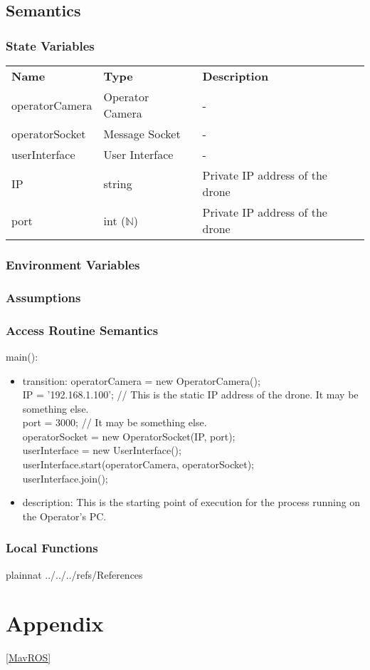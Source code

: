 \documentclass[12pt, titlepage]{article}
\begin{document}
\subsection{Semantics}
\subsubsection{State Variables}
\begin{center}
\begin{tabular}{p{3 cm} p{4cm} p{5cm} }
\hline
\textbf{Name} & \textbf{Type} & \textbf{Description}  \\
operatorCamera & Operator Camera & - \\
operatorSocket & Message Socket & - \\
userInterface & User Interface & - \\
IP & string & Private IP address of the drone \\
port & int ($\mathbb{N}$) & Private IP address of the drone \\
\hline
\hline
\end{tabular}
\end{center}
\subsubsection{Environment Variables}
\subsubsection{Assumptions}
\subsubsection{Access Routine Semantics}
\noindent main():
\begin{itemize}
\item transition: operatorCamera = new OperatorCamera(); \\
IP = '192.168.1.100'; // This is the static IP address of the drone. It may be something else. \\
port = 3000; // It may be something else. \\
operatorSocket = new OperatorSocket(IP, port); \\
userInterface = new UserInterface();\\
userInterface.start(operatorCamera, operatorSocket);\\
userInterface.join();
\item description: This is the starting point of execution for the process running on the Operator's PC.
\end{itemize}
\subsubsection{Local Functions}
\newpage






 {plainnat}
 {../../../refs/References}

\newpage

\section{Appendix} \label{Appendix}



\ref{MavROS}


\end{document}
